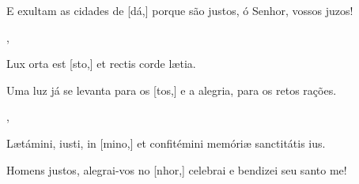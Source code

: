 {    {\item E exultam as cidades de [dá,] porque são justos, ó Senhor, vossos juzos!~\Responsorium},
  {\item {}Lux orta est [sto,] et rectis corde lætia.}
    {\item {}Uma luz já se levanta para os [tos,] e a alegria, para os retos rações.~\Responsorium},
  {\item {}Lætámini, iusti, in [mino,] et confitémini memóriæ sanctitátis ius.}
    {\item {}Homens justos, alegrai-vos no [nhor,] celebrai e bendizei seu santo me!~\Responsorium}
}